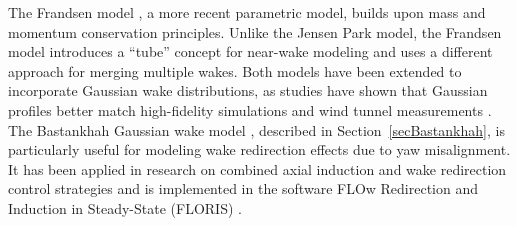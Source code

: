 \begin{table}[ht]
    \begin{center}
        \caption{Overview of wind farm models and simulation tools. Models and software marked in bold are used in this thesis.}
        \label{tab:WFModels}
    \end{center}
\end{table}
%
The Frandsen model \cite{frandsen2006analytical}, a more recent parametric model, builds upon mass and momentum conservation principles. Unlike the Jensen Park model, the Frandsen model introduces a ``tube'' concept for near-wake modeling and uses a different approach for merging multiple wakes. Both models have been extended to incorporate Gaussian wake distributions, as studies have shown that Gaussian profiles better match high-fidelity simulations \cite{sizhuang2014analysis} and wind tunnel measurements \cite{bastankhah2014new}.
%
The Bastankhah Gaussian wake model \cite{bastankhah2016experimental}, described in Section~\ref{secBastankhah}, is particularly useful for modeling wake redirection effects due to yaw misalignment. It has been applied in research on combined axial induction and wake redirection control strategies \cite{boersma2019constrained} and is implemented in the software FLOw Redirection and Induction in Steady-State (FLORIS) \cite{fleming2021experimental}.

